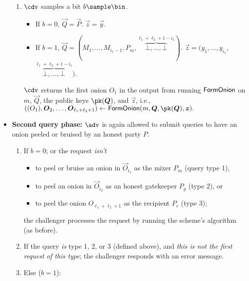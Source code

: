 \documentclass[runningheads,a4paper]{llncs}
\begin{document}
\begin{itemize}
\begin{enumerate}[resume]
\item $\cdv$ samples a bit $b \sample \bin$. 
\begin{itemize}
    \item If $b=0$, $\vec{Q} = \vec{P}$. $\vec{z} = \vec{y}$.

    \item If $b=1$, $\vec{Q} = (M_1, \dots, M_{i_1-1}, P_m, \overbrace{\bot, \dots, \bot}^{\ell_1+\ell_2+1-i_1})$. $\vec{z} = (y_1, \dots, y_{i_1}$, $\overbrace{\bot, \dots, \bot}^{\ell_1+\ell_2+1-i_1})$. 
\end{itemize}
$\cdv$ returns the first onion $O_1$ in the output from running $\mathsf{FormOnion}$ on $m$, $\vec{Q}$, the public keys $\pk(\vec{Q})$, and $\vec{z}$, i.e., 
    $
    ((O_1), \vec{O}_2, \dots, \vec{O}_{\ell_1+\ell_2+1}) \gets \formonion(m, \vec{Q}, \pk(\vec{Q}), \vec{z}) .
    $

\end{enumerate}

\item \textbf{Second query phase:} $\adv$ is again allowed to submit queries to have an onion peeled or bruised by an honest party $P$. 
\begin{enumerate}[resume]
\item If $b=0$; or the request \emph{isn't} 
\begin{itemize}
    \item to peel or bruise an onion in $\vec{O}_{i_1}$ as the mixer $P_m$ (query type 1), 
        \item to peel an onion in $\vec{O}_{i_2}$ as an honest gatekeeper $P_g$ (type 2), or
    \item to peel the onion $O_{\ell_1 + \ell_2+1}$ as the recipient $P_r$ (type 3); 
\end{itemize} 
the challenger processes the request by running the scheme's algorithm (as before). 

\item If the query \emph{is} type 1, 2, or 3 (defined above), 
and \emph{this is not the first request of this type}; 
the challenger responds with an error message. 

\item Else ($b=1$): 


\end{enumerate}
\end{itemize}
\end{document}
